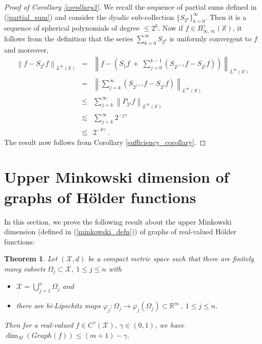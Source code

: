 \documentclass[12pt]{amsart}
\newtheorem{theorem}{Theorem}[section]
\theoremstyle{definition}
\newcommand{\X}{\mathbb X}%
\numberwithin{equation}{section}
\begin{document}
\begin{proof}[Proof of Corollary \ref{corollary3}] 
We recall the sequence of partial sums defined in (\ref{partial_sum}) and consider the dyadic sub-collection $\{S_{2^k}\}_{k=0}^\infty$. Then it is a sequence of spherical polynomials of degree $\le 2^k$. Now if $f \in B^\gamma_{\infty, \infty}(\X)$, it follows from the definition that the series $\sum_{k=0}^\infty S_{2^k}$ is uniformly convergent to $f$ and moreover,
\begin{eqnarray*}
\left\|f-S_{2^k}f\right\|_{L^\infty(\X)} &=& \left\|f-\left(S_1f\:+\:\sum_{j=0}^{k-1}\left(S_{2^{j+1}}f-S_{2^j}f\right)\right)\right\|_{L^\infty(\X)}\\
&=& \left\|\sum_{j=k}^\infty \left(S_{2^{j+1}}f-S_{2^j}f\right)\right\|_{L^\infty(\X)}\\
&\le & \sum_{j=k}^\infty \left\|P_{2^j}f\right\|_{L^\infty(\X)} \\
& \lesssim & \sum_{j=k}^\infty 2^{-j\gamma}\\
& \lesssim & 2^{-k\gamma}\:.
\end{eqnarray*}
The result now follows from Corollary \ref{sufficiency_corollary}.
\end{proof}


\section{Upper Minkowski dimension of graphs of H\"older functions}
\label{sec5}
In this section, we prove the following result about the upper Minkowski dimension (defined in (\ref{minkowski_defn})) of  graphs of real-valued H\"older functions:
\begin{theorem} \label{thm_gmt}
Let $(\mathcal{X},d)$ be a compact metric space such that there are finitely many subsets $\Omega_j \subset \mathcal{X},\:1 \le j \le n$ with
\begin{itemize}
\item $\mathcal{X} = \displaystyle\bigcup_{j=1}^n \Omega_j$ and
\item there are bi-Lipschitz maps $\varphi_j : \Omega_j \to \varphi_j\left(\Omega_j\right) \subset \mathbb{R}^m\:,\: 1\le j \le n$. 
\end{itemize}
Then for a real-valued $f \in C^\gamma(\mathcal{X}),\:\gamma \in (0,1)$, we have $\overline{\dim}_M\left(Graph(f)\right) \le (m+1)-\gamma$\:.
\end{theorem}
\end{document}
